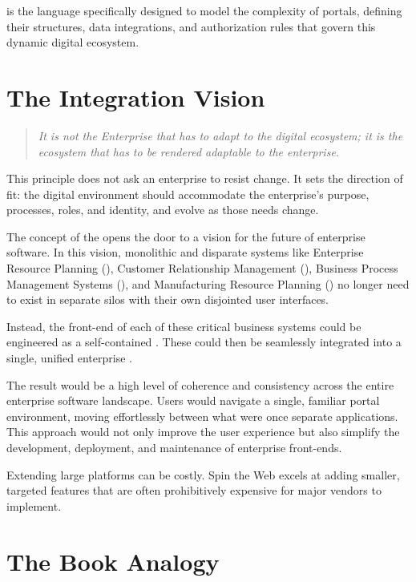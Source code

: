\wbol{} is the language specifically designed to model the complexity of portals, defining their structures, data integrations, and authorization rules that govern this dynamic digital ecosystem.

\section{The Integration Vision}
\label{sec:integration-vision}

\begin{quote}
\textit{It is not the Enterprise that has to adapt to the digital ecosystem; it is the ecosystem that has to be rendered adaptable to the enterprise.}
\end{quote}

This principle does not ask an enterprise to resist change. It sets the direction of fit: the digital environment should accommodate the enterprise's purpose, processes, roles, and identity, and evolve as those needs change.

The concept of the \textbf{\webbaselet{}} opens the door to a vision for the future of enterprise software. In this vision, monolithic and disparate systems like Enterprise Resource Planning (\erp{}), Customer Relationship Management (\crm{}), Business Process Management Systems (\bpms{}), and Manufacturing Resource Planning (\mrp{}) no longer need to exist in separate silos with their own disjointed user interfaces.

Instead, the front-end of each of these critical business systems could be engineered as a self-contained \textbf{\webbaselet{}}. These  could then be seamlessly integrated into a single, unified enterprise \textbf{\webbase{}}.

The result would be a high level of coherence and consistency across the entire enterprise software landscape. Users would navigate a single, familiar portal environment, moving effortlessly between what were once separate applications. This approach would not only improve the user experience but also simplify the development, deployment, and maintenance of enterprise front-ends.

Extending large platforms can be costly. Spin the Web excels at adding smaller, targeted features that are often prohibitively expensive for major vendors to implement.

\section{The Book Analogy}
\label{sec:book-analogy}

